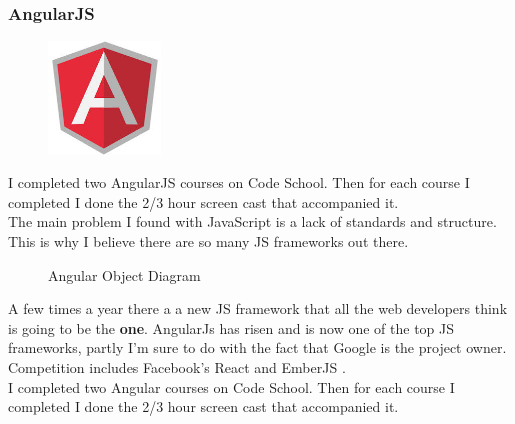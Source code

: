 \subsubsection{AngularJS}
\begin{figure}
	\includegraphics[width=3cm]{img/mobile-app/logos/angular.jpg}
	\centering
\end{figure}

I completed two AngularJS \cite{angular} courses on Code School. 
Then for each course I completed I done the 2/3 hour screen cast that accompanied it.
\\
The main problem I found with JavaScript is a lack of standards and structure. 
This is why I believe there are so many JS frameworks out there.
\begin{figure}[H] 
	\caption{Angular Object Diagram}
	\label{fig:speciation}
\end{figure}
A few times a year there a a new JS framework that all the web developers think is going to be the \textbf{one}.
AngularJs has risen and is now one of the top JS frameworks, partly I'm sure to do with the fact that Google is the project owner.
Competition includes Facebook's React \cite{react} and EmberJS \cite{ember}.
\\

I completed two Angular courses on Code School. 
Then for each course I completed I done the 2/3 hour screen cast that accompanied it.
\\

